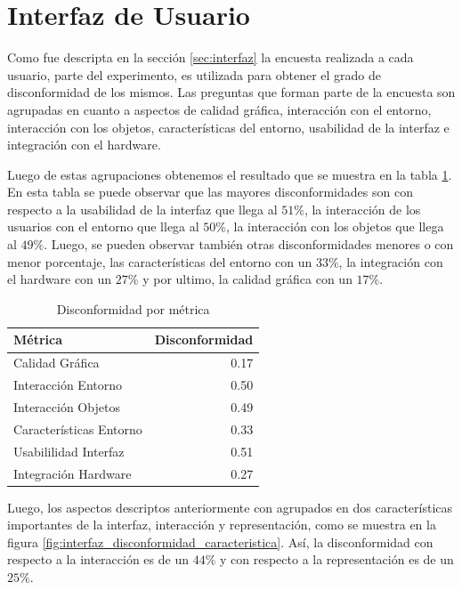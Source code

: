 \section{Interfaz de Usuario}
\label{sec:res_INTERFAZ}

Como fue descripta en la sección \ref{sec:interfaz} la encuesta realizada a cada usuario, parte del experimento, es utilizada
para obtener el grado de disconformidad de los mismos. Las preguntas que forman parte de la  encuesta son agrupadas en cuanto a aspectos de calidad gráfica, interacción con el entorno, interacción con los objetos, características del entorno, usabilidad de la interfaz e integración con el hardware.

Luego de estas agrupaciones obtenemos el resultado que se muestra en la tabla \ref{tab:interfaz_disconformidad_metrica}. En esta tabla se puede observar que las mayores disconformidades son con respecto a la usabilidad de la interfaz que llega al $51\%$, la interacción de los usuarios con el entorno que llega al $50\%$, la interacción con los objetos que llega al $49\%$. Luego, se pueden observar también otras disconformidades menores o con menor porcentaje, las características del entorno con un  $33\%$, la integración con el hardware con un  $27\%$ y por ultimo, la calidad gráfica con un  $17\%$.

\begin{table}[!hbt]
\centering
\begin{tabular}{|l|r|}
\hline
\rowcolor{gris} \textbf{Métrica} & \textbf{Disconformidad} \\
\hline
Calidad Gráfica & 0.17 \\
\hline
Interacción Entorno & 0.50\\
\hline
Interacción Objetos & 0.49\\
\hline
Características Entorno & 0.33\\
\hline
Usabililidad Interfaz & 0.51\\
\hline
Integración Hardware & 0.27\\
\hline
\end{tabular}
\caption{Disconformidad por métrica}
\label{tab:interfaz_disconformidad_metrica}
\end{table}


Luego, los aspectos descriptos anteriormente con agrupados en dos características importantes de la interfaz, interacción y representación, como se muestra en la figura \ref{fig:interfaz_disconformidad_caracteristica}.  Así, la disconformidad con respecto a la interacción es de un  $44\%$ y con respecto a la representación es de un  $25\%$. 

